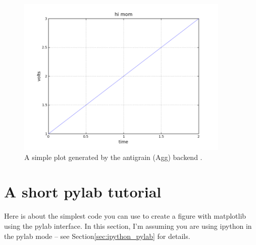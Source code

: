 %
\begin{figure}
\begin{centering}
\includegraphics[width=4in]{fig/mpl_one_two_three}
\par\end{centering}

\caption{\label{fig:mpl_agg}A simple plot generated by the antigrain (Agg)
backend .}

\end{figure}



\section[pylab tutorial]{A short pylab tutorial}

Here is about the simplest code you can use to create a figure with
matplotlib using the pylab interface. In this section, I'm assuming
you are using ipython in the pylab mode -- see Section\ref{sec:ipython_pylab}
for details.

